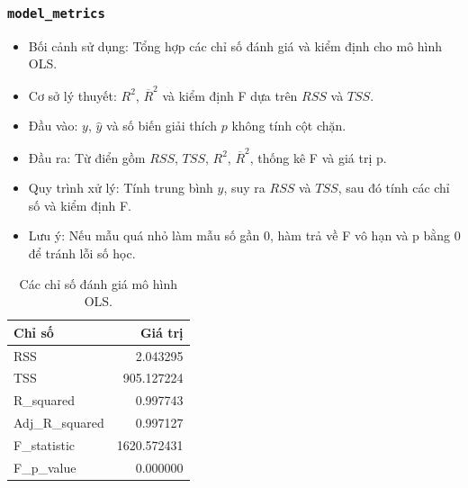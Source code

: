\documentclass[a4paper]{article}
\newcommand{\code}[1]{\colorbox{light-gray}{\texttt{#1}}}
\begin{document}
\subsubsection{\texorpdfstring{\code{model\_metrics}}{model\_metrics}}
\begin{itemize}[leftmargin=*]
    \item Bối cảnh sử dụng: Tổng hợp các chỉ số đánh giá và kiểm định cho mô hình OLS.
    \item Cơ sở lý thuyết: $R^2$, $\overline{R}^2$ và kiểm định F dựa trên $RSS$ và $TSS$.
    \item Đầu vào: $y$, $\hat{y}$ và số biến giải thích $p$ không tính cột chặn.
    \item Đầu ra: Từ điển gồm $RSS$, $TSS$, $R^2$, $\overline{R}^2$, thống kê F và giá trị p.
    \item Quy trình xử lý: Tính trung bình $y$, suy ra $RSS$ và $TSS$, sau đó tính các chỉ số và kiểm định F.
    \item Lưu ý: Nếu mẫu quá nhỏ làm mẫu số gần 0, hàm trả về F vô hạn và p bằng 0 để tránh lỗi số học.
\end{itemize}
\begin{table}[H]
    \centering
    \small
    \begin{tabular}{lr}
    \toprule
    \textbf{Chỉ số} & \textbf{Giá trị} \\
    \midrule
    RSS & 2.043295 \\
    TSS & 905.127224 \\
    R\_squared & 0.997743 \\
    Adj\_R\_squared & 0.997127 \\
    F\_statistic & 1620.572431 \\
    F\_p\_value & 0.000000 \\
    \bottomrule
    \end{tabular}
    \caption{Các chỉ số đánh giá mô hình OLS.}
\end{table}
\end{document}
